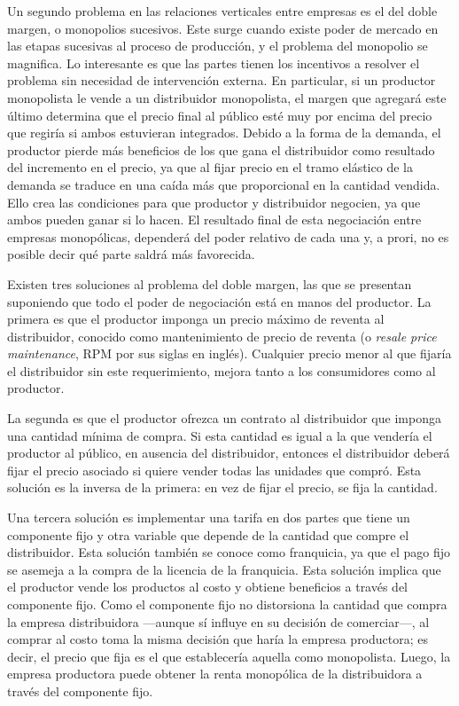 \documentclass[
  12pt,
  spanish,
]{book}
\begin{document}
Un segundo problema en las relaciones verticales entre empresas es el del doble margen, o monopolios sucesivos. Este surge cuando existe poder de mercado en las etapas sucesivas al proceso de producción, y el problema del monopolio se magnifica. Lo interesante es que las partes tienen los incentivos a resolver el problema sin necesidad de intervención externa. En particular, si un productor monopolista le vende a un distribuidor monopolista, el margen que agregará este último determina que el precio final al público esté muy por encima del precio que regiría si ambos estuvieran integrados. Debido a la forma de la demanda, el productor pierde más beneficios de los que gana el distribuidor como resultado del incremento en el precio, ya que al fijar precio en el tramo elástico de la demanda se traduce en una caída más que proporcional en la cantidad vendida. Ello crea las condiciones para que productor y distribuidor negocien, ya que ambos pueden ganar si lo hacen. El resultado final de esta negociación entre empresas monopólicas, dependerá del poder relativo de cada una y, a prori, no es posible decir qué parte saldrá más favorecida.

Existen tres soluciones al problema del doble margen, las que se presentan suponiendo que todo el poder de negociación está en manos del productor. La primera es que el productor imponga un precio máximo de reventa al distribuidor, conocido como mantenimiento de precio de reventa (o \emph{resale price maintenance}, RPM por sus siglas en inglés). Cualquier precio menor al que fijaría el distribuidor sin este requerimiento, mejora tanto a los consumidores como al productor.

La segunda es que el productor ofrezca un contrato al distribuidor que imponga una cantidad mínima de compra. Si esta cantidad es igual a la que vendería el productor al público, en ausencia del distribuidor, entonces el distribuidor deberá fijar el precio asociado si quiere vender todas las unidades que compró. Esta solución es la inversa de la primera: en vez de fijar el precio, se fija la cantidad.

Una tercera solución es implementar una tarifa en dos partes que tiene un componente fijo y otra variable que depende de la cantidad que compre el distribuidor. Esta solución también se conoce como franquicia, ya que el pago fijo se asemeja a la compra de la licencia de la franquicia. Esta solución implica que el productor vende los productos al costo y obtiene beneficios a través del componente fijo. Como el componente fijo no distorsiona la cantidad que compra la empresa distribuidora ---aunque sí influye en su decisión de comerciar---, al comprar al costo toma la misma decisión que haría la empresa productora; es decir, el precio que fija es el que establecería aquella como monopolista. Luego, la empresa productora puede obtener la renta monopólica de la distribuidora a través del componente fijo.
\end{document}
